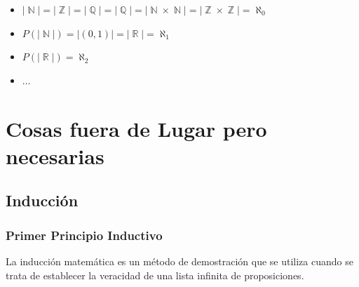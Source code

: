 \documentclass[12pt, fleqn]{report}                             %
\theoremstyle{break}                                            %
\DeclareMathOperator \Naturals     {\mathbb{N}}                 %
\DeclareMathOperator \Integers     {\mathbb{Z}}                 %
\DeclareMathOperator \Racionals    {\mathbb{Q}}                 %
\DeclareMathOperator \Reals        {\mathbb{R}}                 %
\begin{document}
            \begin{itemize} 
                \item $|\Naturals| = |\Integers| = |\Racionals| = |\Racionals|
                                   = |\Naturals \times \Naturals| = |\Integers \times \Integers| = \aleph_0$

                \item $P(|\Naturals|) = |(0, 1)| = |\Reals| = \aleph_1$

                \item $P(|\Reals|) = \aleph_2$

                \item $\dots$

            \end{itemize} 








\part{Cosas fuera de Lugar pero necesarias}

    \chapter{Inducción}
        \clearpage



        \clearpage
        \section{Primer Principio Inductivo}

            La inducción matemática es un método de demostración que se utiliza cuando se trata
            de establecer la veracidad de una lista infinita de proposiciones.
\end{document}
